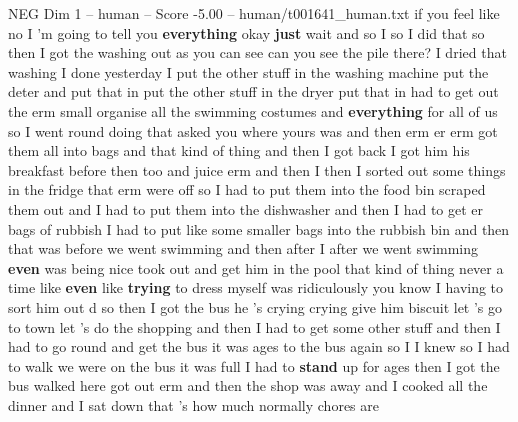 \begin{textsample}{NEG Dim 1 – human – Score -5.00 – human/t001641\_human.txt}  \label{ex:f1_neg_034}
if you feel like no I 'm going to tell you \textbf{everything} okay \textbf{just} wait and so I so I did that so then I got the washing out as you can see can you see the pile there?
I dried that washing I done yesterday I put the other stuff in the washing machine put the deter and put that in put the other stuff in the dryer put that in had to get out the erm small organise all the swimming costumes and \textbf{everything} for all of us so I went round doing that asked you where yours was and then erm er erm got them all into bags and that kind of thing and then I got back I got him his breakfast before then too and juice erm and then I then I sorted out some things in the fridge that erm were off so I had to put them into the food bin scraped them out and I had to put them into the dishwasher and then I had to get er bags of rubbish I had to put like some smaller bags into the rubbish bin and then that was before we went swimming and then after I after we went swimming \textbf{even} was being nice took out and get him in the pool that kind of thing never a time like \textbf{even} like \textbf{trying} to dress myself was ridiculously you know I having to sort him out d so then I got the bus he 's crying crying give him biscuit let 's go to town let 's do the shopping and then I had to get some other stuff and then I had to go round and get the bus it was ages to the bus again so I I knew so I had to walk we were on the bus it was full I had to \textbf{stand} up for ages then I got the bus walked here got out erm and then the shop was away and I cooked all the dinner and I sat down that 's how much normally chores are

\end{textsample}
